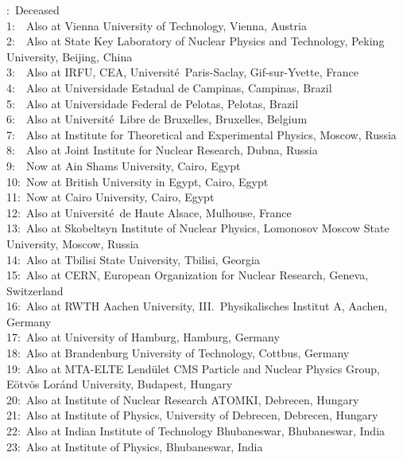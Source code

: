 \dag:~Deceased\\
1:~~Also at Vienna University of Technology, Vienna, Austria\\
2:~~Also at State Key Laboratory of Nuclear Physics and Technology, Peking University, Beijing, China\\
3:~~Also at IRFU, CEA, Universit\'{e}~Paris-Saclay, Gif-sur-Yvette, France\\
4:~~Also at Universidade Estadual de Campinas, Campinas, Brazil\\
5:~~Also at Universidade Federal de Pelotas, Pelotas, Brazil\\
6:~~Also at Universit\'{e}~Libre de Bruxelles, Bruxelles, Belgium\\
7:~~Also at Institute for Theoretical and Experimental Physics, Moscow, Russia\\
8:~~Also at Joint Institute for Nuclear Research, Dubna, Russia\\
9:~~Now at Ain Shams University, Cairo, Egypt\\
10:~Now at British University in Egypt, Cairo, Egypt\\
11:~Now at Cairo University, Cairo, Egypt\\
12:~Also at Universit\'{e}~de Haute Alsace, Mulhouse, France\\
13:~Also at Skobeltsyn Institute of Nuclear Physics, Lomonosov Moscow State University, Moscow, Russia\\
14:~Also at Tbilisi State University, Tbilisi, Georgia\\
15:~Also at CERN, European Organization for Nuclear Research, Geneva, Switzerland\\
16:~Also at RWTH Aachen University, III.~Physikalisches Institut A, Aachen, Germany\\
17:~Also at University of Hamburg, Hamburg, Germany\\
18:~Also at Brandenburg University of Technology, Cottbus, Germany\\
19:~Also at MTA-ELTE Lend\"{u}let CMS Particle and Nuclear Physics Group, E\"{o}tv\"{o}s Lor\'{a}nd University, Budapest, Hungary\\
20:~Also at Institute of Nuclear Research ATOMKI, Debrecen, Hungary\\
21:~Also at Institute of Physics, University of Debrecen, Debrecen, Hungary\\
22:~Also at Indian Institute of Technology Bhubaneswar, Bhubaneswar, India\\
23:~Also at Institute of Physics, Bhubaneswar, India\\
